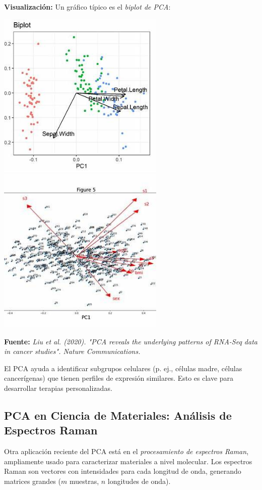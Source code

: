 \documentclass[12pt]{article}
\begin{document}
        \vspace{1em}
        \noindent
        \textbf{Visualización:} Un gráfico típico es el \emph{biplot de PCA}:
        \begin{center}
                \includegraphics[width=0.6\textwidth]{imagenes/pca_biplot_genomics.png}
                \includegraphics[width=0.6\textwidth]{imagenes/pca_biplot_genomics1.png}
        \end{center}
        
        \noindent
        \textbf{Fuente:} \emph{Liu et al. (2020). "PCA reveals the underlying patterns of RNA-Seq data in cancer studies". Nature Communications.}
        
        \vspace{1em}
        \noindent
        El PCA ayuda a identificar subgrupos celulares (p. ej., células madre, células cancerígenas) que tienen perfiles de expresión similares. Esto es clave para desarrollar terapias personalizadas.
        
        \subsection*{PCA en Ciencia de Materiales: Análisis de Espectros Raman}
        \noindent
        Otra aplicación reciente del PCA está en el \emph{procesamiento de espectros Raman}, ampliamente usado para caracterizar materiales a nivel molecular. Los espectros Raman son vectores con intensidades para cada longitud de onda, generando matrices grandes ($ m $ muestras, $ n $ longitudes de onda).
        
\end{document}
